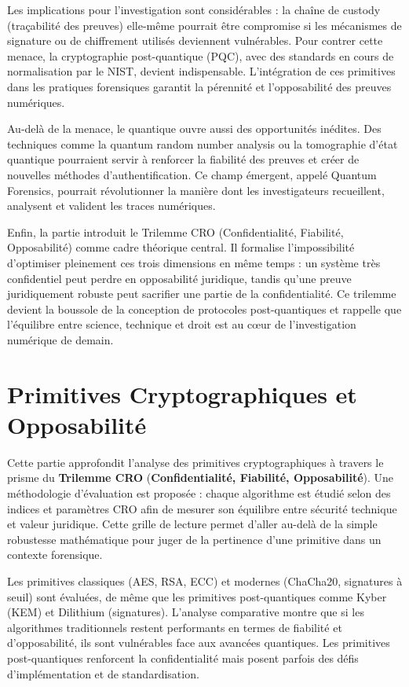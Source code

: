 \documentclass[memoire, 12pt]{report}
\begin{document}
Les implications pour l’investigation sont considérables : la chaîne de custody (traçabilité des preuves) elle-même pourrait être compromise si les mécanismes de signature ou de chiffrement utilisés deviennent vulnérables. Pour contrer cette menace, la cryptographie post-quantique (PQC), avec des standards en cours de normalisation par le NIST, devient indispensable. L’intégration de ces primitives dans les pratiques forensiques garantit la pérennité et l’opposabilité des preuves numériques.

Au-delà de la menace, le quantique ouvre aussi des opportunités inédites. Des techniques comme la quantum random number analysis ou la tomographie d’état quantique pourraient servir à renforcer la fiabilité des preuves et créer de nouvelles méthodes d’authentification. Ce champ émergent, appelé Quantum Forensics, pourrait révolutionner la manière dont les investigateurs recueillent, analysent et valident les traces numériques.

Enfin, la partie introduit le Trilemme CRO (Confidentialité, Fiabilité, Opposabilité) comme cadre théorique central. Il formalise l’impossibilité d’optimiser pleinement ces trois dimensions en même temps : un système très confidentiel peut perdre en opposabilité juridique, tandis qu’une preuve juridiquement robuste peut sacrifier une partie de la confidentialité. Ce trilemme devient la boussole de la conception de protocoles post-quantiques et rappelle que l’équilibre entre science, technique et droit est au cœur de l’investigation numérique de demain.


\section*{Primitives Cryptographiques et Opposabilité}
Cette partie approfondit l’analyse des primitives cryptographiques à travers le prisme du \textbf{Trilemme CRO} (\textbf{Confidentialité, Fiabilité, Opposabilité}). Une méthodologie d’évaluation est proposée : chaque algorithme est étudié selon des indices et paramètres CRO afin de mesurer son équilibre entre sécurité technique et valeur juridique. Cette grille de lecture permet d’aller au-delà de la simple robustesse mathématique pour juger de la pertinence d’une primitive dans un contexte forensique.

Les primitives classiques (AES, RSA, ECC) et modernes (ChaCha20, signatures à seuil) sont évaluées, de même que les primitives post-quantiques comme Kyber (KEM) et Dilithium (signatures). L’analyse comparative montre que si les algorithmes traditionnels restent performants en termes de fiabilité et d’opposabilité, ils sont vulnérables face aux avancées quantiques. Les primitives post-quantiques renforcent la confidentialité mais posent parfois des défis d’implémentation et de standardisation.
\end{document}
